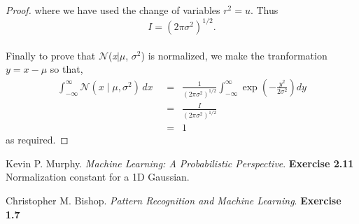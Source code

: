 \documentclass[14pt]{extarticle}
\begin{document}
\begin{flushleft}
\begin{proof}
where we have used the change of variables $r^2 = u$.
Thus $$I = \left(2\pi\sigma^2\right)^{1/2}.$$
\\
Finally to prove that $\mathcal{N}$(\textit{x}$\mid$$\mu$, $\sigma$$^{2}$) is normalized, we make the tranformation $y = x - \mu$ so that,
\begin{align*}
\int_{-\infty}^{\infty} \mathcal{N}(\textit{x}\mid\mu, \sigma^{2})\,dx \,\,&= \,\,\,\frac{1}{\left(2\pi\sigma^2\right)^{1/2}} \int_{-\infty}^{\infty} \exp\left(-\frac{y^2}{2\sigma^2}\right)dy\\
&=\,\,\,\frac{I}{{\left(2\pi\sigma^2\right)^{1/2}}}\\
&=\,\,\,1
\end{align*} 
as required.
\end{proof}	
\end{flushleft}
\begin{thebibliography}{9}
Kevin P. Murphy. 
\textit{Machine Learning: A Probabilistic Perspective}. 
\textbf{Exercise 2.11} Normalization constant for a 1D Gaussian.
 
Christopher M. Bishop. 
\textit{ Pattern Recognition and Machine Learning}.  
\textbf{Exercise 1.7}
\end{thebibliography}
\end{document}
